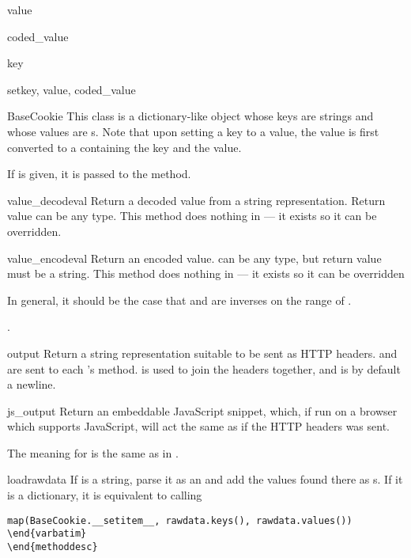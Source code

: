 \begin{memberdesc}[Morsel]{value}
\begin{memberdesc}[Morsel]{coded_value}
\begin{memberdesc}[Morsel]{key}
\begin{methodesc}[Morsel]{set}{key, value, coded_value}
\begin{classdesc}{BaseCookie}{}
This class is a dictionary-like object whose keys are strings and
whose values are s. Note that upon setting a key to
a value, the value is first converted to a  containing
the key and the value.

If  is given, it is passed to the  method.
\end{classdesc}

\begin{methoddesc}[BaseCookie]{value_decode}{val}
Return a decoded value from a string representation. Return value can
be any type. This method does nothing in  --- it exists
so it can be overridden.
\end{methoddesc}

\begin{methoddesc}[BaseCookie]{value_encode}{val}
Return an encoded value.  can be any type, but return value
must be a string. This method does nothing in  --- it exists
so it can be overridden

In general, it should be the case that  and 
 are inverses on the range of .
\end{methoddesc}.

\begin{methoddesc}[BaseCookie]{output}{}
Return a string representation suitable to be sent as HTTP headers.
 and  are sent to each 's 
method.  is used to join the headers together, and is by default
a newline.
\end{methoddesc}

\begin{methoddesc}[BaseCookie]{js_output}{}
Return an embeddable JavaScript snippet, which, if run on a browser which
supports JavaScript, will act the same as if the HTTP headers was sent.

The meaning for  is the same as in .
\end{methoddesc}

\begin{methoddesc}[BaseCookie]{load}{rawdata}
If  is a string, parse it as an  and add
the values found there as s. If it is a dictionary, it
is equivalent to calling

\begin{verbatim}
map(BaseCookie.__setitem__, rawdata.keys(), rawdata.values())
\end{varbatim}
\end{methoddesc}


\end{verbatim}
\end{methoddesc}
\end{methodesc}
\end{memberdesc}
\end{memberdesc}
\end{memberdesc}
